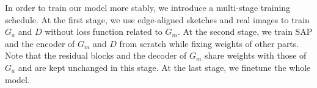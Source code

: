 
In order to train our model more stably, we introduce a multi-stage training schedule. At the first stage, we use edge-aligned sketches and real images to train $G_a$ and $D$ without loss function related to $G_m$. At the second stage, we train SAP and the encoder of $G_m$ and $D$ from scratch while fixing weights of other parts. Note that the residual blocks and the decoder of $G_m$ share weights with those of $G_a$ and are kept unchanged in this stage. At the last stage, we finetune the whole model. 